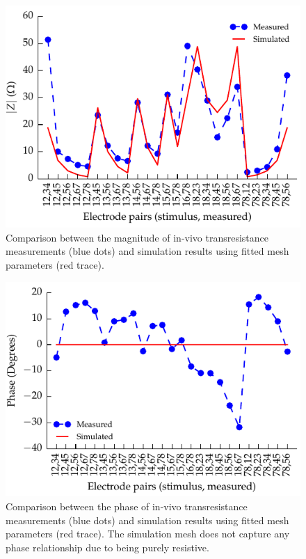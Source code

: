 \documentclass[journal, a4paper]{IEEEtran}
\begin{document}
\begin{figure}
    \begin{center}
        \includegraphics{graphics/sheep_transimpedance_magnitude}
    \end{center}
    \caption{\color{blue} Comparison between the magnitude of in-vivo transresistance measurements (blue dots) and simulation results using fitted mesh parameters (red trace).}
    \label{fig:transimpedance_sheep_mag}
\end{figure}

\begin{figure}
    \begin{center}
        \includegraphics{graphics/sheep_transimpedance_phase}
    \end{center}
    \caption{\color{blue} Comparison between the phase of in-vivo transresistance measurements (blue dots) and simulation results using fitted mesh parameters (red trace). The simulation mesh does not capture any phase relationship due to being purely resistive.}
    \label{fig:transimpedance_sheep_phase}
\end{figure}
\end{document}

